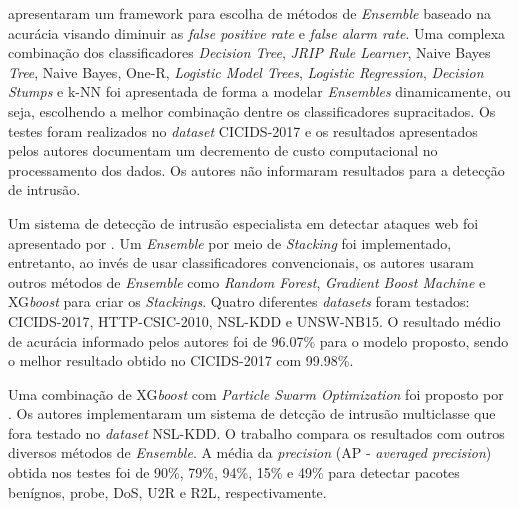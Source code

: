  apresentaram um framework para escolha de métodos de \textit{Ensemble} baseado na acurácia visando diminuir as \textit{false positive rate} e \textit{false alarm rate}. Uma complexa combinação dos classificadores \textit{Decision Tree}, \textit{JRIP Rule Learner}, Naive Bayes \textit{Tree}, Naive Bayes, One-R, \textit{Logistic Model Trees}, \textit{Logistic Regression}, \textit{Decision Stumps} e k-NN foi apresentada de forma a modelar \textit{Ensembles} dinamicamente, ou seja, escolhendo a melhor combinação dentre os classificadores supracitados. Os testes foram realizados no \textit{dataset} CICIDS-2017 e os resultados apresentados pelos autores documentam um decremento de custo computacional no processamento dos dados. Os autores não informaram resultados para a detecção de intrusão. 

Um sistema de detecção de intrusão especialista em detectar ataques web foi apresentado por . Um \textit{Ensemble} por meio de \textit{Stacking} foi implementado, entretanto, ao invés de usar classificadores convencionais, os autores usaram outros métodos de \textit{Ensemble} como \textit{Random Forest}, \textit{Gradient Boost Machine} e XG\textit{boost} para criar os \textit{Stackings}. Quatro diferentes \textit{datasets} foram testados: CICIDS-2017, HTTP-CSIC-2010, NSL-KDD e UNSW-NB15. O resultado médio de acurácia informado pelos autores foi de 96.07\% para o modelo proposto, sendo o melhor resultado obtido no CICIDS-2017 com 99.98\%.

Uma combinação de XG\textit{boost} com \textit{Particle Swarm Optimization} foi proposto por . Os autores implementaram um sistema de detcção de intrusão multiclasse que fora testado no \textit{dataset} NSL-KDD. O trabalho compara os resultados com outros diversos métodos de \textit{Ensemble}. A média da \textit{precision} (AP - \textit{averaged precision}) obtida nos testes foi de 90\%, 79\%, 94\%, 15\% e 49\% para detectar pacotes benígnos, probe, DoS, U2R e R2L, respectivamente.





